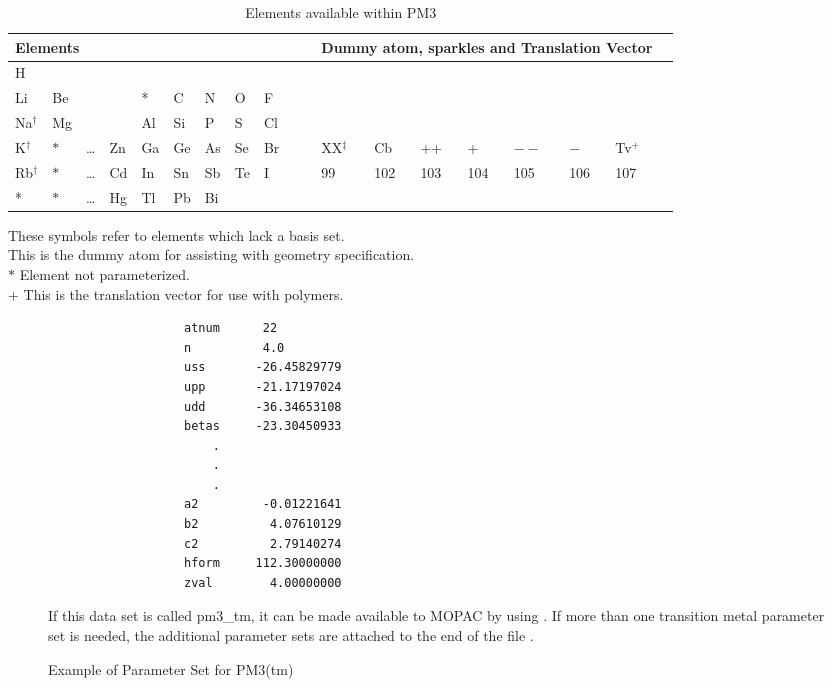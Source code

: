 \begin{table}
\begin{center}
\caption{\label{pm3el} Elements available within
PM3}\hspace*{-0.7in} \compresstable
\begin{tabular}{lllllllllllllllllll}
\multicolumn{7}{l}{Elements}&&&&&\multicolumn{7}{l}{Dummy atom, sparkles and
 Translation Vector} \\
\hline
   H  \\
  Li &Be& &   & *& C& N& O& F           \\
  Na$^{\dag}$&Mg&   &   &Al&Si& P& S&Cl &&&       &                         \\
   K$^{\dag}$&$*$&\ldots& Zn&Ga&Ge&As&Se&Br &&&     XX$^{\ddag}$& Cb& ++&  +& $--$&  $-$& Tv$^+$  \\
  Rb$^{\dag}$&$*$&\ldots& Cd&In&Sn&Sb&Te& I &&&     99&102&103&104&105&106&107  \\
  *  &$*$&\ldots& Hg&Tl&Pb&Bi&   \\
\hline
\end{tabular}
\end{center}
\dag  These symbols refer to elements which lack a basis set.  \\
\ddag  This is the dummy atom for assisting with geometry specification.  \\
$*$  Element not parameterized.  \\
+  This is the translation vector for use with polymers.  \\
\end{table}

\begin{figure}
\caption{\label{pm3_tm}Example of Parameter Set for PM3(tm)}
\begin{verbatim}
                   atnum      22
                   n          4.0
                   uss       -26.45829779
                   upp       -21.17197024
                   udd       -36.34653108
                   betas     -23.30450933
                       .
                       .
                       .
                   a2         -0.01221641
                   b2          4.07610129
                   c2          2.79140274
                   hform     112.30000000
                   zval        4.00000000
\end{verbatim}
If this data set is called pm3\_tm, it can be made available to MOPAC by using
. If more than one transition metal parameter set is needed,
the additional parameter sets are attached to the end of the file .
\end{figure}

